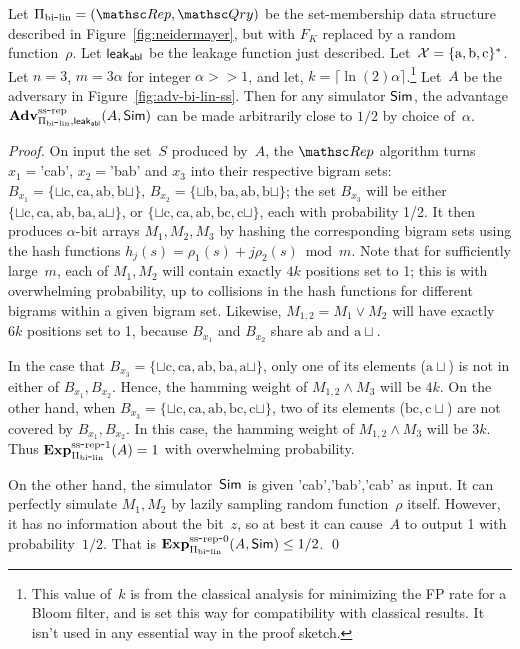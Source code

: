 \begin{theorem}\label{thm:bi-lin-ss}
Let $\setprim_{\bilin}= (\Rep, \Qry)$ be the set-membership data
structure described in Figure~\ref{fig:neidermayer}, but with
$F_{K}$ replaced by a random function~$\rho$. Let
${\sf leak}_{\mathsf{abl}}$ be the leakage function just described.
Let~${\cal X}=\{\mathrm{a,b,c}\}^*$. Let $n=3$,  $m=3\alpha $ for
integer $\alpha >> 1$, and let, $k = \lceil \ln(2) \alpha
\rceil$.\footnote{This value of~$k$ is from the classical analysis for
minimizing the FP rate for a Bloom filter, and is set this way for
compatibility with classical results.  It isn't used in any
essential way in the proof sketch.}  Let~$A$ be the adversary in
Figure~\ref{fig:adv-bi-lin-ss}.  Then for any simulator ${\sf Sim}$, the
advantage
$\mathrm{\mathbf{Adv}}^{\mathrm{ss\mbox{-}rep}}_{\Pi_{\mathrm{bi}\mbox{-}\mathrm{lin}},{\sf leak}_{\mathsf{abl}}}(A,{\sf Sim})$ can be
made arbitrarily close to $1/2$ by choice of~$\alpha$.
\end{theorem}
\begin{proof}%
On input the set~$S$ produced by~$A$, the $\Rep$ algorithm turns $x_1=$'cab', $x_2=$'bab' and $x_3$ into their respective bigram sets: $B_{x_1}=\{\sqcup\mathrm{c},\mathrm{ca},\mathrm{ab},\mathrm{b}\sqcup\}$, $B_{x_2}=\{\sqcup\mathrm{b},\mathrm{ba},\mathrm{ab}, \mathrm{b}\sqcup \}$; the set $B_{x_3}$ will be either $\{\sqcup\mathrm{c},\mathrm{ca},\mathrm{ab},\mathrm{ba}, \mathrm{a}\sqcup\}$, or $\{\sqcup\mathrm{c},\mathrm{ca},\mathrm{ab},\mathrm{bc}, \mathrm{c}\sqcup\}$, each with probability 1/2.  It then produces $\alpha$-bit arrays $M_1, M_2, M_3$ by hashing the corresponding bigram sets using the hash functions $h_j(s)=\rho_1(s)+ j\rho_2(s) \bmod m$.  Note that for sufficiently large~$m$, each of $M_1,M_2$ will contain exactly $4k$ positions set to 1; this is with overwhelming probability, up to collisions in the hash functions for different bigrams within a given bigram set.  Likewise, $M_{1,2}=M_1 \vee M_2$ will have exactly $6k$ positions set to 1, because $B_{x_1}$ and $B_{x_2}$ share $\mathrm{ab}$ and $\mathrm{a}\sqcup$.

In the case that $B_{x_3}=\{\sqcup\mathrm{c},\mathrm{ca},\mathrm{ab},\mathrm{ba}, \mathrm{a}\sqcup\}$, only one of its elements ($\mathrm{a}\sqcup$) is not in either of $B_{x_1},B_{x_2}$.  Hence, the hamming weight of $M_{1,2}\wedge M_3$ will be $4k$.  On the other hand, when $B_{x_3} = \{\sqcup\mathrm{c},\mathrm{ca},\mathrm{ab},\mathrm{bc}, \mathrm{c}\sqcup\}$, two of its elements ($\mathrm{bc}, \mathrm{c}\sqcup$) are not covered by $B_{x_1},B_{x_2}$.  In this case, the hamming weight of $M_{1,2} \wedge M_3$ will be $3k$.  Thus $\mathrm{\mathbf{Exp}}^{\mathrm{ss\mbox{-}rep\mbox{-}1}}_{\Pi_{\mathrm{bi}\mbox{-}\mathrm{lin}}}(A)=1$ with overwhelming probability.

On the other hand, the simulator~${\sf Sim}$ is given 'cab','bab','cab' as
input.  It can perfectly simulate $M_1,M_2$ by lazily sampling random
function~$\rho$ itself.  However, it has no information about the
bit~$z$, so at best it can cause~$A$ to output 1 with
probability~$1/2$.  That is $\mathrm{\mathbf{Exp}}^{\mathrm{ss\mbox{-}rep\mbox{-}0}}_{\Pi_{\mathrm{bi}\mbox{-}\mathrm{lin}}}(A,{\sf Sim}) \leq 1/2$. \hfill\qed
\end{proof}





